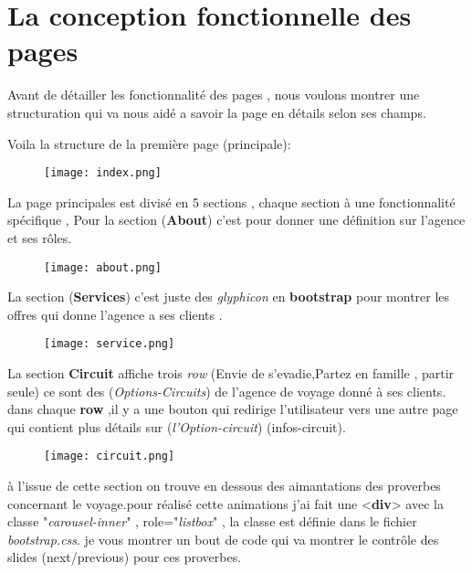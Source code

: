 \documentclass[a4paper,12pt]{report}
\begin{document}
\section{La conception fonctionnelle des pages}
\begin{tcolorbox}
Avant de détailler les fonctionnalité des pages , nous voulons montrer une structuration qui va nous aidé a savoir la page en détails selon ses champs.
\end{tcolorbox}
Voila la structure de la première page (principale):
\begin{figure}[H]
\begin{center}
\centering
\texttt{[image: index.png]}
\end{center}
\label{index}
\end{figure}
La page principales est divisé en 5 sections , chaque section à une fonctionnalité spécifique , Pour la section (\textbf{About}) c'est pour donner une définition sur l'agence et ses rôles.
\begin{figure}[H]
\begin{center}
\centering
\texttt{[image: about.png]}
\end{center}
\label{about}
\end{figure}
La section (\textbf{Services}) c'est juste des \textit{glyphicon} en \textbf{bootstrap} pour montrer les offres qui donne l'agence a ses clients .
\begin{figure}[H]
\begin{center}
\centering
\texttt{[image: service.png]}
\end{center}
\label{service}
\end{figure}
La section \textbf{Circuit} affiche trois \textit{row} (Envie de s'evadie,Partez en famille , partir seule) ce sont des (\textit{Options-Circuits}) de l'agence de voyage donné à ses clients.
dans chaque \textbf{row} ,il y a une bouton qui redirige l'utilisateur vers une autre page qui contient plus détails sur (\textit{l'Option-circuit}) (infos-circuit).
\begin{figure}[H]
\begin{center}
\centering
\texttt{[image: circuit.png]}
\end{center}
\label{circuit}
\end{figure}
à l'issue de cette section on trouve en dessous des aimantations des proverbes concernant le voyage.pour réalisé cette animations j'ai fait une <\textbf{div}> avec la classe "\textit{carousel-inner}" , role="\textit{listbox}" , la classe est définie dans le fichier \textit{bootstrap.css}. je vous montrer un bout de code qui va montrer le contrôle des slides (next/previous) pour ces proverbes.
\end{document}
